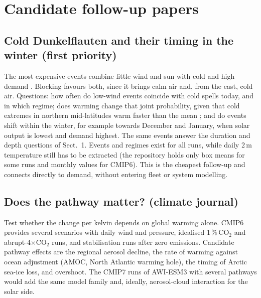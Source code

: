 \documentclass[10pt,a4paper]{article}
\begin{document}
\section{Candidate follow-up papers}

\subsection{Cold Dunkelflauten and their timing in the winter (first priority)}
The most expensive events combine little wind and sun with cold and high demand \cite{vanderWiel2019}. Blocking
favours both, since it brings calm air and, from the east, cold air. Questions: how often do low-wind events
coincide with cold spells today, and in which regime; does warming change that joint probability, given that cold
extremes in northern mid-latitudes warm faster than the mean \cite{Screen2014}; and do events shift within the winter,
for example towards December and January, when solar output is lowest and demand highest. The same events answer the
duration and depth questions of Sect.~1. Events and regimes exist for all runs, while daily 2\,m temperature still
has to be extracted (the repository holds only box means for some runs and monthly values for CMIP6). This is the
cheapest follow-up and connects directly to demand, without entering fleet or system modelling.

\subsection{Does the pathway matter? (climate journal)}
Test whether the change per kelvin depends on global warming alone. CMIP6 provides several scenarios with daily wind
and pressure, idealised 1\,\%\,CO$_2$ and abrupt-4$\times$CO$_2$ runs, and stabilisation runs after zero emissions.
Candidate pathway effects are the regional aerosol decline, the rate of warming against ocean adjustment (AMOC,
North Atlantic warming hole), the timing of Arctic sea-ice loss, and overshoot. The CMIP7 runs of AWI-ESM3 with
several pathways would add the same model family and, ideally, aerosol-cloud interaction for the solar side.
\end{document}
